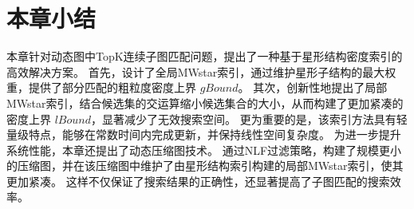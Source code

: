 \section{本章小结}
本章针对动态图中TopK连续子图匹配问题，提出了一种基于星形结构密度索引的高效解决方案。
首先，设计了全局MWstar索引，通过维护星形子结构的最大权重，提供了部分匹配的粗粒度密度上界 $gBound$。
其次，创新性地提出了局部MWstar索引，结合候选集的交运算缩小候选集合的大小，从而构建了更加紧凑的密度上界 $lBound$，显著减少了无效搜索空间。
更为重要的是，该索引方法具有轻量级特点，能够在常数时间内完成更新，并保持线性空间复杂度。
为进一步提升系统性能，本章还提出了动态压缩图技术。
通过NLF过滤策略，构建了规模更小的压缩图，并在该压缩图中维护了由星形结构索引构建的局部MWstar索引，使其更加紧凑。
这样不仅保证了搜索结果的正确性，还显著提高了子图匹配的搜索效率。
